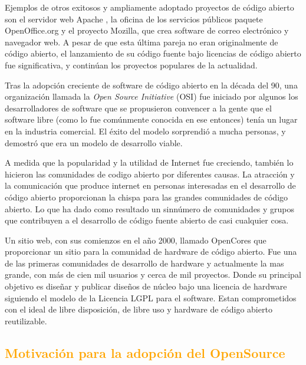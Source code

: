 \documentclass[a4paper,11pt]{article}
\begin{document}
Ejemplos de otros exitosos y ampliamente adoptado proyectos de código abierto son el servidor web Apache , la oficina de los servicios públicos paquete OpenOffice.org y el proyecto Mozilla, que crea software de correo electrónico y navegador web. A pesar de que esta última pareja no eran originalmente de código abierto, el lanzamiento de su código fuente bajo licencias de código abierto fue significativa, y continúan los proyectos populares de la actualidad.

Tras la adopción creciente de software de código abierto en la década del 90, una organización llamada la \textit{Open Source Initiative} (OSI) fue iniciado por algunos los desarrolladores de software que se propusieron convencer a la gente que el software libre (como lo fue comúnmente conocida en ese entonces) tenía un lugar en la industria comercial. El éxito del modelo sorprendió a mucha personas, y demostró que era un modelo de desarrollo viable.  

A medida que la popularidad y la utilidad de Internet fue creciendo, también lo hicieron las  comunidades de codigo abierto por diferentes causas. La atracción y la comunicación que produce internet en personas interesadas en el desarrollo de código abierto proporcionan la chispa para las grandes comunidades de código abierto. Lo que ha dado como resultado un sinnúmero de comunidades y  grupos que contribuyen a el desarrollo de código fuente abierto de casi cualquier cosa.

Un sitio web, con sus comienzos en el año 2000, llamado OpenCores que proporcionar un sitio para la comunidad de hardware de código abierto. Fue una de las primeras comunidades de desarrollo de hardware y actualmente la mas grande, con más de cien mil usuarios y cerca de mil proyectos. Donde su principal objetivo es diseñar y publicar diseños de núcleo bajo una licencia de hardware siguiendo el modelo de la Licencia LGPL para el software. Estan comprometidos con el ideal de libre disposición, de libre uso y hardware de código abierto reutilizable.%


		
		\subsection{\textcolor{orange}{Motivación para la adopción del OpenSource}}
\end{document}
